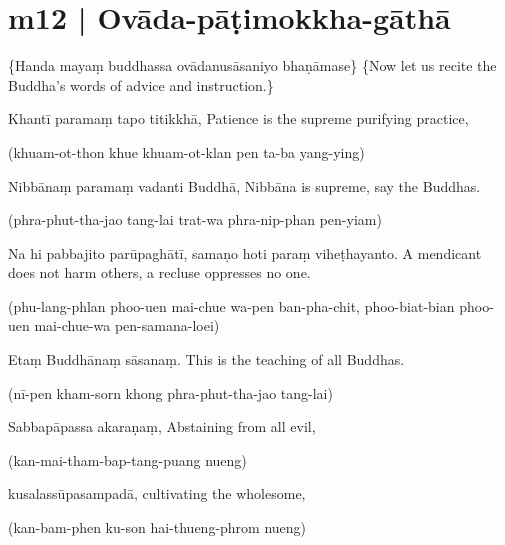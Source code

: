 
\section*{m12 | Ovāda-pāṭimokkha-gāthā}

\begin{chantsubsection}
  \chantnote
    {\{Handa mayaṃ buddhassa ovādanusāsaniyo bhaṇāmase\}}
  \chantnotetrans
    {\{Now let us recite the Buddha's words of advice and instruction.\}}
\end{chantsubsection}
\chantgap
\begin{chantsubsection}
  \chantnote
    {Khantī paramaṃ tapo titikkhā,}
  \chantindent
    {Patience is the supreme purifying practice,}
  \par\chantindent
    {(khuam-ot-thon khue khuam-ot-klan pen ta-ba yang-ying)}
  \chantgap

  \chantnote
    {Nibbānaṃ paramaṃ vadanti Buddhā,}
  \chantindent
    {Nibbāna is supreme, say the Buddhas.}
    \par
  \chantindent
    {(phra-phut-tha-jao tang-lai trat-wa phra-nip-phan pen-yiam)}
  \chantgap

  \chantnote
    {Na hi pabbajito parūpaghātī, samaṇo hoti paraṃ viheṭhayanto.}
  \chantindent
    {A mendicant does not harm others, a recluse oppresses no one.}
  \par\chantindent
    {(phu-lang-phlan phoo-uen mai-chue wa-pen ban-pha-chit, phoo-biat-bian phoo-uen mai-chue-wa pen-samana-loei)}
  \chantgap

  \chantnote
    {Etaṃ Buddhānaṃ sāsanaṃ.}
  \chantindent
    {This is the teaching of all Buddhas.}
    \par
  \chantindent
    {(nī-pen kham-sorn khong phra-phut-tha-jao tang-lai)}
  \chantgap

  \chantnote
    {Sabbapāpassa akaraṇaṃ,}
  \chantindent
    {Abstaining from all evil,}
  \par\chantindent
    {(kan-mai-tham-bap-tang-puang nueng)}
  \chantgap

  \chantnote
    {kusalassūpasampadā,}
  \chantindent
    {cultivating the wholesome,}
    \par
  \chantindent
    {(kan-bam-phen ku-son hai-thueng-phrom nueng)}
  \chantgap


\end{chantsubsection}
